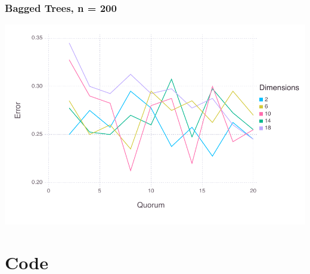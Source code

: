 \documentclass[a4paper,12pt]{article}
\begin{document}
\subsubsection*{Bagged Trees, n = 200}
\includegraphics[width=\linewidth]{figures/problemset_6_1.pdf}








\section*{Code}
\end{document}
